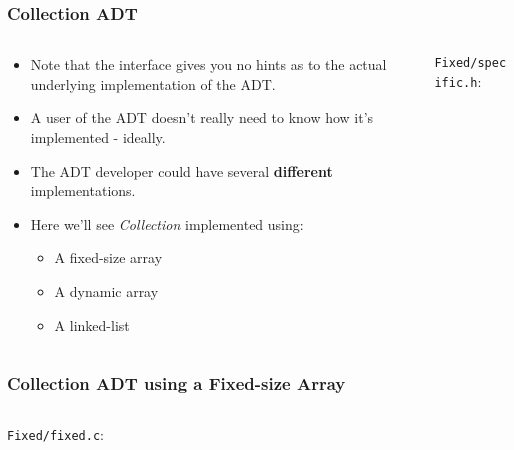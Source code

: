 \begin{frame}[fragile]
\frametitle{Collection ADT}
\begin{columns}[T]

\begin{column}{0.45\textwidth}
\begin{itemize}[<+->]
\item Note that the interface gives you no hints as to the actual underlying
implementation of the ADT.
\item A user of the ADT doesn't really need to know how it's
implemented - ideally.
\item The ADT developer could have several {\bf different} implementations.
\item Here we'll see {\em Collection} implemented using:
\begin{itemize}[<+->]
\item A fixed-size array
\item A dynamic array
\item A linked-list
\end{itemize}
\end{itemize}
\end{column}

\pause
\begin{column}{0.45\textwidth}
\verb^Fixed/specific.h^:

\end{column}

\end{columns}
\end{frame}


\begin{frame}[fragile]
\frametitle{Collection ADT using a Fixed-size Array}
\begin{columns}[T]

\begin{column}{0.45\textwidth}
\verb^Fixed/fixed.c^:

\end{column}

\pause
\begin{column}{0.45\textwidth}

\end{column}

\end{columns}
\end{frame}

